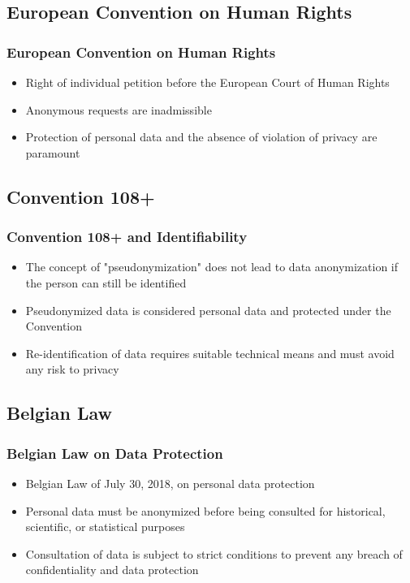 \documentclass[
english,
svgnames,
notes=hide,
12pt]{beamer}
\begin{document}
\begin{frame}
  \section{European Convention on Human Rights}
  \frametitle{European Convention on Human Rights}
  \begin{itemize}
    \item Right of individual petition before the European Court of Human Rights \pause
    \item Anonymous requests are inadmissible \pause
    \item Protection of personal data and the absence of violation of privacy are paramount 
  \end{itemize}
\end{frame}

\begin{frame}
  \section{Convention 108+}
  \frametitle{Convention 108+ and Identifiability}
  \begin{itemize}
    \item The concept of "pseudonymization" does not lead to data anonymization if the person can still be identified \pause
    \item Pseudonymized data is considered personal data and protected under the Convention \pause
    \item Re-identification of data requires suitable technical means and must avoid any risk to privacy 
  \end{itemize}
\end{frame}

\begin{frame}
  \section{Belgian Law}
  \frametitle{Belgian Law on Data Protection}
  \begin{itemize}
    \item Belgian Law of July 30, 2018, on personal data protection \pause
    \item Personal data must be anonymized before being consulted for historical, scientific, or statistical purposes \pause
    \item Consultation of data is subject to strict conditions to prevent any breach of confidentiality and data protection 
  \end{itemize}
\end{frame}
\end{document}
